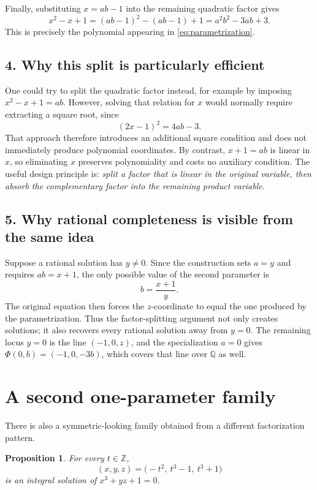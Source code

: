 \documentclass[11pt]{article}
\newtheorem{proposition}[theorem]{Proposition}
\theoremstyle{remark}
\newcommand{\Z}{\mathbb{Z}}
\newcommand{\Q}{\mathbb{Q}}
\begin{document}
Finally, substituting $x=ab-1$ into the remaining quadratic factor
gives
\[
 x^2-x+1
 =(ab-1)^2-(ab-1)+1
 =a^2b^2-3ab+3.
\]
This is precisely the polynomial appearing in
\eqref{eq:parametrization}.

\subsection*{4. Why this split is particularly efficient}
One could try to split the quadratic factor instead, for example by
imposing $x^2-x+1=ab$.  However, solving that relation for $x$ would
normally require extracting a square root, since
\[
 (2x-1)^2=4ab-3.
\]
That approach therefore introduces an additional square condition and
does not immediately produce polynomial coordinates.  By contrast,
$x+1=ab$ is linear in $x$, so eliminating $x$ preserves polynomiality
and costs no auxiliary condition.  The useful design principle is:
\emph{split a factor that is linear in the original variable, then
absorb the complementary factor into the remaining product variable.}

\subsection*{5. Why rational completeness is visible from the same idea}
Suppose a rational solution has $y\ne0$.  Since the construction sets
$a=y$ and requires $ab=x+1$, the only possible value of the second
parameter is
\[
 b=\frac{x+1}{y}.
\]
The original equation then forces the $z$-coordinate to equal the one
produced by the parametrization.  Thus the factor-splitting argument
not only creates solutions; it also recovers every rational solution
away from $y=0$.  The remaining locus $y=0$ is the line
$(-1,0,z)$, and the specialization $a=0$ gives
$\Phi(0,b)=(-1,0,-3b)$, which covers that line over $\Q$ as well.

\section{A second one-parameter family}

There is also a symmetric-looking family obtained from a different
factorization pattern.

\begin{proposition}\label{prop:symmetric}
For every $t\in\Z$,
\begin{equation}\label{eq:symmetric}
 \boxed{(x,y,z)=\bigl(-t^2,\ t^3-1,\ t^3+1\bigr)}
\end{equation}
is an integral solution of $x^3+yz+1=0$.
\end{proposition}
\end{document}
